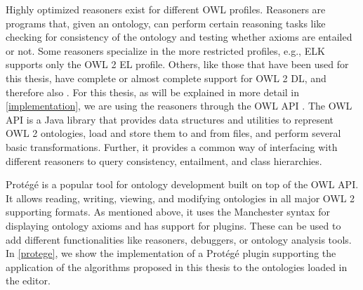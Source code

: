 Highly optimized reasoners exist for different OWL profiles. Reasoners are programs that, given an ontology, can perform certain reasoning tasks like checking for consistency of the ontology and testing whether axioms are entailed or not. Some reasoners specialize in the more restricted profiles, e.g., ELK \cite{kazakov2014elk} supports only the OWL 2 EL profile. Others, like those that have been used for this thesis, have complete or almost complete support for OWL 2 DL, and therefore also \SROIQ. For this thesis, as will be explained in more detail in \cref{implementation}, we are using the reasoners through the OWL API \cite{horridge2011owl}. The OWL API is a Java library that provides data structures and utilities to represent OWL 2 ontologies, load and store them to and from files, and perform several basic transformations. Further, it provides a common way of interfacing with different reasoners to query consistency, entailment, and class hierarchies.

Protégé \cite{musen2015protege} is a popular tool for ontology development built on top of the OWL API. It allows reading, writing, viewing, and modifying ontologies in all major OWL 2 supporting formats. As mentioned above, it uses the Manchester syntax for displaying ontology axioms and has support for plugins. These can be used to add different functionalities like reasoners, debuggers, or ontology analysis tools. In \cref{protege}, we show the implementation of a Protégé plugin supporting the application of the algorithms proposed in this thesis to the ontologies loaded in the editor.


